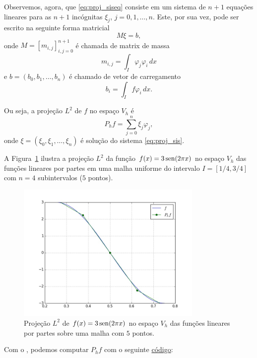 Observemos, agora, que \eqref{eq:proj_siseq} consiste em um sistema de $n+1$ equações lineares para as $n+1$ incógnitas $\xi_j$, $j=0, 1, \dotsc, n$. Este, por sua vez, pode ser escrito na seguinte forma matricial
\begin{equation}\label{eq:proj_sis}
  M\xi = b,
\end{equation}
onde $M = [m_{i,j}]_{i,j=0}^{n+1}$ é chamada de matrix de massa
\begin{equation}
  m_{i,j} = \int_I\varphi_j\varphi_i\,dx
\end{equation}
e $b = (b_0, b_1, \dotsc, b_n)$ é chamado de vetor de carregamento
\begin{equation}
  b_i = \int_I f\varphi_i\,dx.
\end{equation}

Ou seja, a projeção $L^2$ de $f$ no espaço $V_h$ é
\begin{equation}
  P_hf = \sum_{j=0}^n\xi_j\varphi_j,
\end{equation}
onde $\xi = (\xi_0, \xi_1, \dotsc, \xi_n)$ é solução do sistema \eqref{eq:proj_sis}.

\begin{ex}\label{ex:proj}
  A Figura~\ref{fig:ex_proj} ilustra a projeção $L^2$ da função $f(x)=3\operatorname{sen}(2\pi x)$ no espaço $V_h$ das funções lineares por partes em uma malha uniforme do intervalo $I=[1/4, 3/4]$ com $n=4$ subintervalos ($5$ pontos). 

  \begin{figure}[h!]
    \centering
    \includegraphics[width=0.8\textwidth]{./cap_mef1d/dados/ex_proj/ex_proj}
    \caption{Projeção $L^2$ de $f(x)=3\operatorname{sen}(2\pi x)$ no espaço $V_h$ das funções lineares por partes sobre uma malha com $5$ pontos.}
    \label{fig:ex_proj}
  \end{figure}

\ifispython
Com o \fenics, podemos computar $P_h f$ com o seguinte \href{https://github.com/phkonzen/notas/blob/master/src/MetodoElementosFinitos/cap_mef1d/dados/ex_proj/ex_proj.py}{código}:

\fi
\end{ex}

